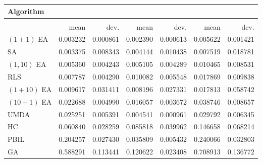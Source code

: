 \begin{tabular}{@{} l *{6}{>{{}}N{1}{2}} @{}}
\toprule
{Algorithm} &  \\
\midrule
&  &  &  \\
\midrule
& {mean} & {dev.} & {mean} & {dev.} & {mean} & {dev.} \\
\midrule
$(1+1)$ EA & 0.003232 & 0.000861 & 0.002390 & 0.000613 & 0.005622 & 0.001421 \\
SA & 0.003375 & 0.008343 & 0.004144 & 0.010438 & 0.007519 & 0.018781 \\
$(1,10)$ EA & 0.005360 & 0.004243 & 0.005105 & 0.004289 & 0.010465 & 0.008531 \\
RLS & 0.007787 & 0.004290 & 0.010082 & 0.005548 & 0.017869 & 0.009838 \\
$(1+10)$ EA & 0.009617 & 0.031411 & 0.008196 & 0.027331 & 0.017813 & 0.058742 \\
$(10+1)$ EA & 0.022688 & 0.004990 & 0.016057 & 0.003672 & 0.038746 & 0.008657 \\
UMDA & 0.025251 & 0.005391 & 0.004541 & 0.000961 & 0.029792 & 0.006345 \\
HC & 0.060840 & 0.028259 & 0.085818 & 0.039962 & 0.146658 & 0.068214 \\
PBIL & 0.204257 & 0.027430 & 0.035809 & 0.005432 & 0.240066 & 0.032803 \\
GA & 0.588291 & 0.113441 & 0.120622 & 0.023408 & 0.708913 & 0.136772 \\
\bottomrule
\end{tabular}
